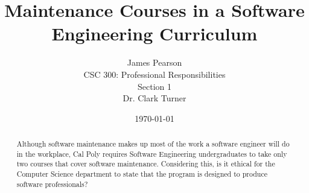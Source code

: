 \documentclass[11pt]{article}
\begin{document}
\title{\vfill Maintenance Courses in a Software Engineering Curriculum} %
\author{
James Pearson \vspace{10pt} \\
CSC 300: Professional Responsibilities  \vspace{10pt} \\
Section 1 \vspace{10pt} \\
Dr. Clark Turner \vspace{10pt} \\
}
\date{\today}

\maketitle

\vfill  %
\begin{abstract}
Although software maintenance makes up most of the work a software engineer will do in the workplace, Cal Poly requires Software Engineering undergraduates to take only two courses that cover software maintenance.  Considering this, is it ethical for the Computer Science department to state that the program is designed to produce software professionals?
\end{abstract}

\thispagestyle{empty} %
\newpage


\thispagestyle{empty}  %
\tableofcontents

\newpage

\end{document}
